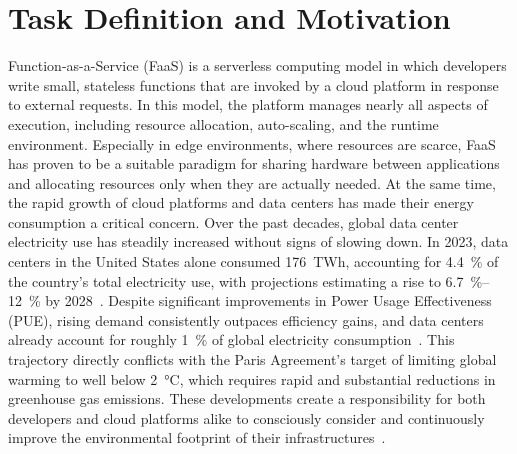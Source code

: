 \clearpage
\section{Task Definition and Motivation}


Function-as-a-Service (FaaS) is a serverless computing model in which developers write small, stateless functions that are invoked by a cloud platform in response to external requests.
In this model, the platform manages nearly all aspects of execution, including resource allocation, auto-scaling, and the runtime environment.
Especially in edge environments, where resources are scarce, FaaS has proven to be a suitable paradigm for sharing hardware between applications and allocating resources only when they are actually needed.
At the same time, the rapid growth of cloud platforms and data centers has made their energy consumption a critical concern.
Over the past decades, global data center electricity use has steadily increased without signs of slowing down.
In 2023, data centers in the United States alone consumed \SI{176}{TWh}, accounting for \SI{4.4}{\percent} of the country's total electricity use, with projections estimating a rise to \SIrange{6.7}{12}{\percent} by 2028~\cite{shehabi_united_2024}.
Despite significant improvements in Power Usage Effectiveness (PUE), rising demand consistently outpaces efficiency gains, and data centers already account for roughly \SI{1}{\percent} of global electricity consumption~\cite{masanet_recalibrating_2020,sharma_jevons_2017,gandhi_metrics_2023}.
This trajectory directly conflicts with the Paris Agreement's target of limiting global warming to well below \SI{2}{\celsius}, which requires rapid and substantial reductions in greenhouse gas emissions.
These developments create a responsibility for both developers and cloud platforms alike to consciously consider and continuously improve the environmental footprint of their infrastructures~\cite{chien_driving_2021}.

